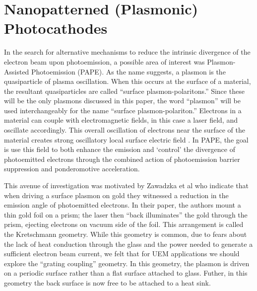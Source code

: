 
\section{Nanopatterned (Plasmonic) Photocathodes}

In the search for alternative mechanisms to reduce the intrinsic divergence of the electron beam upon photoemission, a possible area of interest was Plasmon-Assisted Photoemission (PAPE). 
As the name suggests, a plasmon is the quasiparticle of plasma oscillation.
When this occurs at the surface of a material, the resultant quasiparticles are called ``surface plasmon-polaritons.''
Since these will be the only plasmons discussed in this paper, the word ``plasmon'' will be used interchangeably for the name ``surface plasmon-polariton.''
Electrons in a material can couple with electromagnetic fields, in this case a laser field, and oscillate accordingly.
This overall oscillation of electrons near the surface of the material creates strong oscillatory local surface electric field \cite{cottam_introduction_2004,concepts_2002}.
In PAPE, the goal is use this field to both enhance the emission and `control' the divergence of photoemitted electrons through the combined action of photoemission barrier suppression and ponderomotive acceleration.

This avenue of investigation was motivated by Zawadzka et al \cite{zawadzka_evanescent_2001} who indicate that when driving a surface plasmon on gold they witnessed a reduction in the emission angle of photoemitted electrons.
In their paper, the authors mount a thin gold foil on a prism; the laser then ``back illuminates'' the gold through the prism, ejecting electrons on vacuum side of the foil.
This arrangement is called the Kretschmann geometry.
While this geometry is common, due to fears about the lack of heat conduction through the glass and the power needed to generate a sufficient electron beam current, we felt that for UEM applications we should explore the ``grating coupling'' geometry.
In this geometry, the plasmon is driven on a periodic surface rather than a flat surface attached to glass.
Futher, in this geometry the back surface is now free to be attached to a heat sink.

